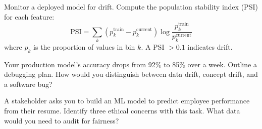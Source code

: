 \begin{exercise}
	Monitor a deployed model for drift. Compute the population stability index (PSI) for each feature:
	\[
		\text{PSI} = \sum_{k} (p_k^{\text{train}} - p_k^{\text{current}}) \log\frac{p_k^{\text{train}}}{p_k^{\text{current}}}
	\]
	where $p_k$ is the proportion of values in bin $k$. A PSI $> 0.1$ indicates drift.
\end{exercise}

\begin{exercise}
	Your production model's accuracy drops from 92\% to 85\% over a week. Outline a debugging plan. How would you distinguish between data drift, concept drift, and a software bug?
\end{exercise}

\begin{exercise}
	A stakeholder asks you to build an ML model to predict employee performance from their resume. Identify three ethical concerns with this task. What data would you need to audit for fairness?
\end{exercise}
